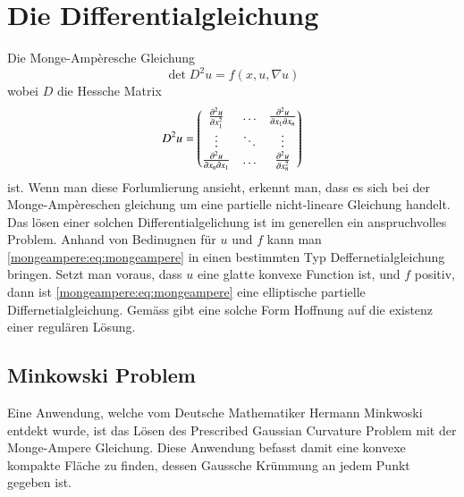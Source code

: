 %
%
%
%
\section{Die Differentialgleichung\label{mongeampere:section:teil0}}
Die Monge-Ampèresche Gleichung
\begin{equation}
  \det D^2 u = f(x, u, \nabla u)
  \label{mongeampere:eq:mongeampere}
\end{equation}
wobei $D$ die Hessche Matrix
\begin{equation}
  D^2 u =
  \begin{pmatrix}
    \pdv[2]{u}{x_1} & \dots &\pdv{u}{x_1}{x_n} \\
  \vdots & \ddots & \vdots \\
  \pdv{u}{x_n}{x_1} & \dots &\pdv[2]{u}{x_n} \\
  \end{pmatrix}
  \label{mongeampere:eq:hess}
\end{equation}
ist.
Wenn man diese Forlumlierung ansieht, erkennt man, dass es sich bei der Monge-Ampèreschen gleichung um eine partielle
nicht-lineare Gleichung handelt.
Das lösen einer solchen Differentialgelichung ist im generellen ein anspruchvolles Problem.
Anhand von Bedinugnen für $u$ und $f$ kann man \eqref{mongeampere:eq:mongeampere} 
in einen bestimmten Typ Deffernetialgleichung bringen.
Setzt man voraus, dass $u$ eine glatte konvexe Function ist, und $f$ positiv, dann ist \eqref{mongeampere:eq:mongeampere}
eine elliptische partielle Differnetialgleichung.
Gemäss \cite{figalli2018mongeampereequation} gibt eine solche Form Hoffnung auf die existenz einer regulären Lösung.

\subsection{Minkowski Problem}
Eine Anwendung, welche vom Deutsche Mathematiker Hermann Minkwoski entdekt wurde, ist das Lösen des
Prescribed Gaussian Curvature Problem mit der Monge-Ampere Gleichung.
Diese Anwendung befasst damit eine konvexe kompakte Fläche zu finden, dessen Gaussche Krümmung 
an jedem Punkt gegeben ist.

